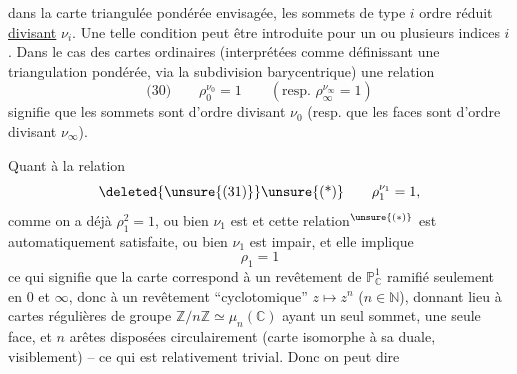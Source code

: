 dans la carte triangulée pondérée envisagée, les sommets de type $i$  ordre réduit \uline{divisant} $\nu_i$. Une telle condition peut être introduite pour un ou plusieurs indices $i$. Dans le cas des cartes ordinaires (interprétées comme définissant une triangulation pondérée, via la subdivision barycentrique) une relation
\[
\text{(30)}\qquad \rho_0^{\nu_0}=1\qquad(\text{resp. }\rho_\infty^{\nu_\infty}=1)
\]
signifie que les sommets sont d'ordre divisant $\nu_0$ (resp. que les faces sont d'ordre divisant $\nu_\infty$).

Quant à la relation
\[
\text{\deleted{\unsure{(31)}}\unsure{(*)}}\qquad \rho_1^{\nu_1}=1,
\]
comme on a déjà $\rho_1^2=1$, ou bien $\nu_1$ est  et cette relation$^{\unsure{(*)}}$ est automatiquement satisfaite, ou bien $\nu_1$ est impair, et elle implique
\[
\rho_1=1
\]
ce qui signifie que la carte correspond à un revêtement de $\mathbb P^1_{\mathbb C}$ ramifié seulement en $0$ et $\infty$, donc à un revêtement ``cyclotomique'' $z\mapsto z^n$ ($n\in\mathbb N$),  donnant lieu à  cartes régulières  de groupe $\mathbb Z/n\mathbb Z\simeq\mu_n(\mathbb C)$ ayant un seul sommet, une seule face, et $n$ arêtes disposées circulairement (carte isomorphe à sa duale, visiblement) -- ce qui est relativement trivial. Donc on peut dire
